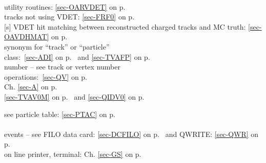  
 \\
 \mysubitem utility routines: \ref{sec-OARVDET} on p.~\pageref{sec-OARVDET}\\
 \mysubitem tracks not using
 VDET: \ref{sec-FRF0} on p.~\pageref{sec-FRF0}\\
 [s] VDET hit matching between  reconstructed charged tracks and MC truth:
 \ref{sec-OAVDHMAT} on p.~\pageref{sec-OAVDHMAT}\\
 synonym for ``track'' or ``particle''\\
 \mysubitem class:~\ref{sec-ADI} on p.~\pageref{sec-ADI} and
 \ref{sec-TVAFP} on p.~\pageref{sec-TVAFP}\\
 \mysubitem number -- see track or vertex number\\
 \mysubitem operations:~\ref{sec-QV} on p.~\pageref{sec-QV}\\
 Ch. \ref{sec-A} on p.~\pageref{sec-A}\\
 \ref{sec-TVAV0M} on p.~\pageref{sec-TVAV0M} and
 \ref{sec-QIDV0} on p.~\pageref{sec-QIDV0}
 
 
 see particle table: \ref{sec-PTAC} on p.~\pageref{sec-PTAC}\\
 \\
 \mysubitem events -- see FILO data card: \ref{sec-DCFILO} on p.~\pageref{sec-DCFILO}
 and QWRITE:
 \ref{sec-QWR} on p.~\pageref{sec-QWR}\\
 \mysubitem on line printer, terminal: Ch. \ref{sec-GS} on p.~\pageref{sec-GS}
 
